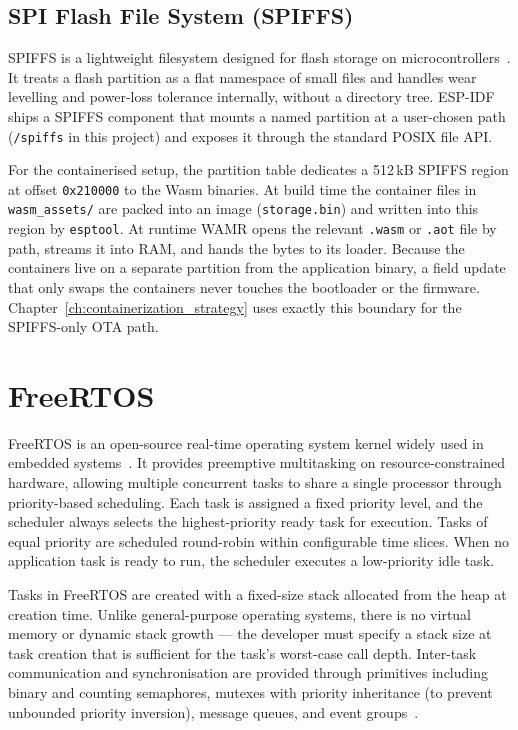 \documentclass[12pt, a4paper]{report}
\begin{document}
\subsection{SPI Flash File System (SPIFFS)}
\label{subsec:esp32-spiffs}

SPIFFS is a lightweight filesystem designed for flash storage on microcontrollers~\cite{spiffs}. It treats a flash partition as a flat namespace of small files and handles wear levelling and power-loss tolerance internally, without a directory tree. ESP-IDF ships a SPIFFS component that mounts a named partition at a user-chosen path (\texttt{/spiffs} in this project) and exposes it through the standard POSIX file API.

For the containerised setup, the partition table dedicates a 512\,kB SPIFFS region at offset \texttt{0x210000} to the Wasm binaries. At build time the container files in \texttt{wasm\_assets/} are packed into an image (\texttt{storage.bin}) and written into this region by \texttt{esptool}. At runtime WAMR opens the relevant \texttt{.wasm} or \texttt{.aot} file by path, streams it into RAM, and hands the bytes to its loader. Because the containers live on a separate partition from the application binary, a field update that only swaps the containers never touches the bootloader or the firmware. Chapter~\ref{ch:containerization_strategy} uses exactly this boundary for the SPIFFS-only OTA path.

\section{FreeRTOS}
\label{subsec:freertos}

FreeRTOS is an open-source real-time operating system kernel widely used in embedded
systems~\cite{freertos-esp}. It provides preemptive multitasking on resource-constrained
hardware, allowing multiple concurrent tasks to share a single processor through
priority-based scheduling. Each task is assigned a fixed priority level, and the scheduler
always selects the highest-priority ready task for execution. Tasks of equal priority are
scheduled round-robin within configurable time slices. When no application task is ready to
run, the scheduler executes a low-priority idle task.

Tasks in FreeRTOS are created with a fixed-size stack allocated from the heap at creation
time. Unlike general-purpose operating systems, there is no virtual memory or dynamic stack
growth --- the developer must specify a stack size at task creation that is sufficient for
the task's worst-case call depth. Inter-task communication and synchronisation are provided
through primitives including binary and counting semaphores, mutexes with priority
inheritance (to prevent unbounded priority inversion), message queues, and event
groups~\cite{astrom-feedback}.
\end{document}
